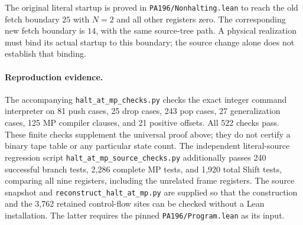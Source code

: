 The original literal startup is proved in
\texttt{PA196/Nonhalting.lean} to reach the old fetch boundary $25$ with
$N=2$ and all other registers zero.  The corresponding new fetch boundary
is $14$, with the same source-tree path.  A physical realization must bind
its actual startup to this boundary; the source change alone does not
establish that binding.

\paragraph{Reproduction evidence.}
The accompanying \texttt{halt\_at\_mp\_checks.py} checks the exact integer
command interpreter on 81 push cases, 25 drop cases, 243 pop cases, 27
generalization cases, 125 MP compiler clauses, and 21 positive offsets.
All 522 checks pass.  These finite checks supplement the universal proof
above; they do not certify a binary tape table or any particular state count.
The independent literal-source regression script
\texttt{halt\_at\_mp\_source\_checks.py} additionally passes 240 successful
branch tests, 2,286 complete MP tests, and 1,920 total Shift tests, comparing
all nine registers, including the unrelated frame registers.  The source
snapshot and \texttt{reconstruct\_halt\_at\_mp.py} are supplied so that
the construction and the 3,762 retained control-flow sites can be checked
without a Lean installation.  The latter requires the pinned
\texttt{PA196/Program.lean} as its input.
